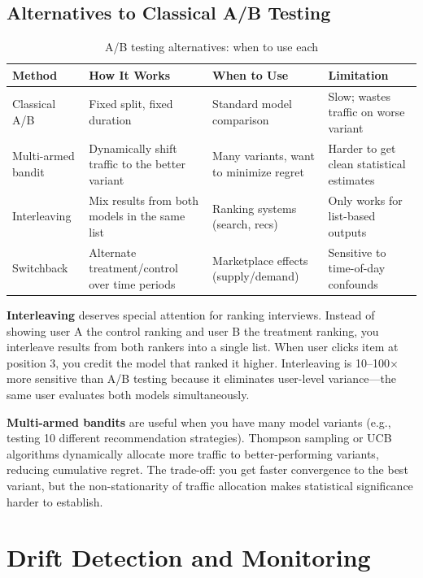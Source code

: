 \subsection{Alternatives to Classical A/B Testing}

\begin{table}[H]
\centering
\caption{A/B testing alternatives: when to use each}
\begin{tabularx}{\textwidth}{lXXX}
\toprule
\textbf{Method} & \textbf{How It Works} & \textbf{When to Use} & \textbf{Limitation} \\
\midrule
Classical A/B & Fixed split, fixed duration & Standard model comparison & Slow; wastes traffic on worse variant \\
Multi-armed bandit & Dynamically shift traffic to the better variant & Many variants, want to minimize regret & Harder to get clean statistical estimates \\
Interleaving & Mix results from both models in the same list & Ranking systems (search, recs) & Only works for list-based outputs \\
Switchback & Alternate treatment/control over time periods & Marketplace effects (supply/demand) & Sensitive to time-of-day confounds \\
\bottomrule
\end{tabularx}
\end{table}

\textbf{Interleaving} deserves special attention for ranking interviews. Instead of showing user A the control ranking and user B the treatment ranking, you interleave results from both rankers into a single list. When user clicks item at position 3, you credit the model that ranked it higher. Interleaving is 10--100$\times$ more sensitive than A/B testing because it eliminates user-level variance---the same user evaluates both models simultaneously.

\textbf{Multi-armed bandits} are useful when you have many model variants (e.g., testing 10 different recommendation strategies). Thompson sampling or UCB algorithms dynamically allocate more traffic to better-performing variants, reducing cumulative regret. The trade-off: you get faster convergence to the best variant, but the non-stationarity of traffic allocation makes statistical significance harder to establish.

\section{Drift Detection and Monitoring}
\label{sec:drift_monitoring}

